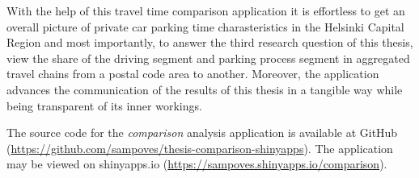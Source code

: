 With the help of this travel time comparison application it is effortless to get an overall picture of private car parking time charasteristics in the Helsinki Capital Region and most importantly, to answer the third research question of this thesis, view the share of the driving segment and parking process segment in aggregated travel chains from a postal code area to another. Moreover, the application advances the communication of the results of this thesis in a tangible way while being transparent of its inner workings.

The source code for the \textit{comparison} analysis application is available at GitHub (\textcolor{blue}{\url{https://github.com/sampoves/thesis-comparison-shinyapps}}). The application may be viewed on shinyapps.io (\textcolor{blue}{\url{https://sampoves.shinyapps.io/comparison}}).


